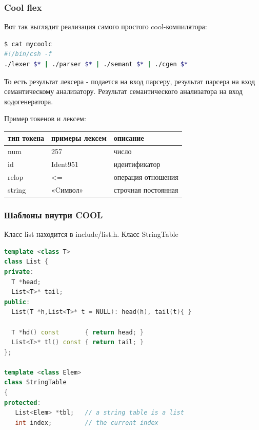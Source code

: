 \documentclass[10pt,fullscreen=true, bookmarks=false]{beamer}
\begin{document}
\begin{frame}[fragile]
\frametitle{Cool flex}

Вот так выглядит реализация самого простого cool-компилятора:
\begin{lstlisting}[language=bash]
$ cat mycoolc
#!/bin/csh -f
./lexer $* | ./parser $* | ./semant $* | ./cgen $*
\end{lstlisting}

То есть результат лексера - подается на вход парсеру, результат парсера на вход семантическому анализатору. Результат семантического анализатора на вход кодогенератора.


Пример токенов и лексем:

\begin{tabular}{|l|l|l|}
\hline
тип токена & примеры лексем &	описание \\
\hline
num 	& 257 &	число \\
\hline
id &	 Ident951 &	идентификатор \\
\hline
relop &	<= & 	операция отношения \\
\hline
string & 	«Cимвол» &	строчная постоянная \\
\hline
\end{tabular}


\tableofcontents[pausesections]
\end{frame}




\begin{frame}[fragile]
\frametitle{Шаблоны внутри COOL}

Класс list находится в include/list.h. Класс StringTable 

\begin{lstlisting}[language=C++,breaklines]
template <class T>
class List {
private:
  T *head;
  List<T>* tail;
public:
  List(T *h,List<T>* t = NULL): head(h), tail(t){ }

  T *hd() const       { return head; }
  List<T>* tl() const { return tail; }
};

template <class Elem>
class StringTable
{
protected:
   List<Elem> *tbl;   // a string table is a list
   int index;         // the current index

\end{lstlisting}


\tableofcontents[pausesections]
\end{frame}
\end{document}
